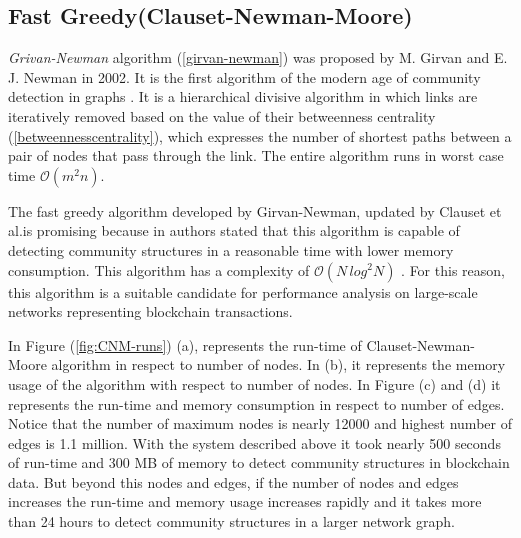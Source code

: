 \subsection{Fast Greedy(Clauset-Newman-Moore)}
\textit{Grivan-Newman} algorithm (\ref{girvan-newman}) was proposed by M. Girvan and E. J. Newman in 2002. It is the first algorithm of the modern age of community detection in graphs \cite{ref-51}. It is a hierarchical divisive algorithm in which links are iteratively removed based on the value of their betweenness centrality (\ref{betweennesscentrality}), which expresses the number of shortest paths between a pair of nodes that pass through the link. The entire algorithm runs in worst case time $\mathcal{O}(m^2n)$.
 

The fast greedy algorithm developed by Girvan-Newman, updated by Clauset et al.is promising because in \cite{ref-31} authors stated that this algorithm is capable of detecting community structures in a reasonable time with lower memory consumption. This algorithm has a complexity of $\mathcal{O}(N\,log^2N)$ \cite{ref-51}. For this reason, this algorithm is a suitable candidate for performance analysis on large-scale networks representing blockchain transactions.

In Figure (\ref{fig:CNM-runs}) (a), represents the run-time of Clauset-Newman-Moore algorithm in respect to number of nodes. In (b), it represents the memory usage of the algorithm with respect to number of nodes. In Figure (c) and (d) it represents the run-time and memory consumption in respect to number of edges. Notice that the number of maximum nodes is nearly 12000 and highest number of edges is 1.1 million. With the system described above it took nearly 500 seconds of run-time and 300 MB of memory to detect community structures in blockchain data. But beyond this nodes and edges, if the number of nodes and edges increases the run-time and memory usage increases rapidly and it takes more than 24 hours to detect community structures in a larger network graph.

